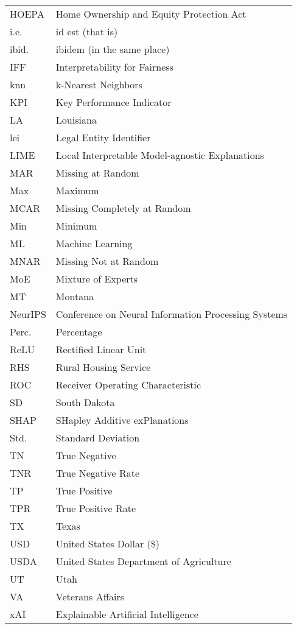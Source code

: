 \documentclass[
	12pt, 
	a4paper, 
	oneside,
	parskip=half*, %
	openany,  %
	listof=totoc, %
	bibliography=totoc, %
	index=totoc, %
  toc=chapterentrywithdots, %
  numbers=noenddot, %
]{scrbook}
\begin{document}
\begin{longtable}{ll}
HOEPA & Home Ownership and Equity Protection Act \\
i.e. & id est (that is) \\
ibid. & ibidem (in the same place) \\
IFF & Interpretability for Fairness \\
knn & k-Nearest Neighbors \\
KPI & Key Performance Indicator \\
LA & Louisiana \\
lei & Legal Entity Identifier \\
LIME & Local Interpretable Model-agnostic Explanations \\
MAR & Missing at Random \\
Max & Maximum \\
MCAR & Missing Completely at Random \\
Min & Minimum \\
ML & Machine Learning \\
MNAR & Missing Not at Random \\
MoE & Mixture of Experts \\
MT & Montana \\
NeurIPS & Conference on Neural Information Processing Systems \\
Perc. & Percentage \\
ReLU & Rectified Linear Unit \\
RHS & Rural Housing Service \\
ROC & Receiver Operating Characteristic \\
SD & South Dakota \\
SHAP & SHapley Additive exPlanations \\
Std. & Standard Deviation \\
TN & True Negative \\
TNR & True Negative Rate \\
TP & True Positive \\
TPR & True Positive Rate \\
TX & Texas \\
USD & United States Dollar (\$) \\
USDA & United States Department of Agriculture \\
UT & Utah \\
VA & Veterans Affairs \\
xAI & Explainable Artificial Intelligence \\
\end{longtable}




\mainmatter
\setcounter{page}{1}







\printbibliography
\end{document}
